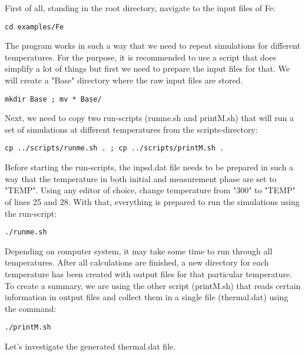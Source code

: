 \documentclass[11pt,fleqn,a4]{book} %
\begin{document}
First of all, standing in the root directory, navigate to the input files of Fe:
\begin{fBox} 
\begin{Verbatim}
cd examples/Fe
\end{Verbatim}
\end{fBox}
The program works in such a way that we need to repeat simulations for different temperatures. For the purpose, it is recommended to use a script that does simplify a lot of things but first we need to prepare the input files for that. We will create a "Base" directory where the raw input files are stored.
\begin{fBox} 
\begin{Verbatim}
mkdir Base ; mv * Base/ 
\end{Verbatim}
\end{fBox}
Next, we need to copy two run-scripts (runme.sh and printM.sh)  that will run a set of simulations at different temperatures from the scripts-directory:
\begin{fBox} 
\begin{Verbatim}
cp ../scripts/runme.sh . ; cp ../scripts/printM.sh .
\end{Verbatim}
\end{fBox}
Before starting the run-scripts, the inpsd.dat file needs to be prepared in such a way that the temperature in both initial and measurement phase are set to "TEMP". Using any editor of choice, change temperature from "300" to "TEMP" of lines 25 and 28. With that, everything is prepared to run the simulations using the run-script:
\begin{fBox} 
\begin{Verbatim}
./runme.sh
\end{Verbatim}
\end{fBox}
Depending on computer system, it may take some time to run through all temperatures. After all calculations are finished, a new directory for each temperature has been created with output files for that particular temperature. To create a summary, we are using the other script (printM.sh) that reads certain information in output files and collect them in a single file (thermal.dat) using the command:
\begin{fBox} 
\begin{Verbatim}
./printM.sh
\end{Verbatim}
\end{fBox}
Let's investigate the generated thermal.dat file.
\end{document}
